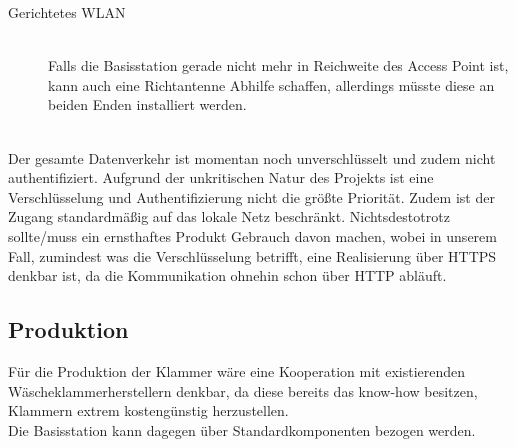 \begin{description}
\begin{description}
			\item [Gerichtetes WLAN] \hfill \\
				Falls die Basisstation gerade nicht mehr in Reichweite des Access Point ist, kann auch eine Richtantenne Abhilfe schaffen, allerdings müsste diese an beiden Enden installiert werden.
		\end{description}
	\item [Verschlüsselung] \hfill \\
		Der gesamte Datenverkehr ist momentan noch unverschlüsselt und zudem nicht authentifiziert. Aufgrund der unkritischen Natur des Projekts ist eine Verschlüsselung und Authentifizierung nicht die größte Priorität. Zudem ist der Zugang standardmäßig auf das lokale Netz beschränkt. Nichtsdestotrotz sollte/muss ein ernsthaftes Produkt Gebrauch davon machen, wobei in unserem Fall, zumindest was die Verschlüsselung betrifft, eine Realisierung über HTTPS denkbar ist, da die Kommunikation ohnehin schon über HTTP abläuft.
	\item
\end{description}
\subsection{Produktion}
Für die Produktion der Klammer wäre eine Kooperation mit existierenden Wäscheklammerherstellern denkbar, da diese bereits das know-how besitzen, Klammern extrem kostengünstig herzustellen. \\
Die Basisstation kann dagegen über Standardkomponenten bezogen werden.